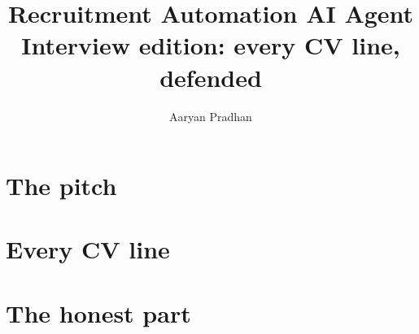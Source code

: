 \documentclass[11pt,oneside]{book}
\title{Recruitment Automation AI Agent\\[0.3em]\large Interview edition: every CV line, defended}
\author{Aaryan Pradhan}
\date{}
\begin{document}
\frontmatter
\maketitle
\tableofcontents


\mainmatter
\part{The pitch}


\part{Every CV line}




\part{The honest part}


\backmatter
\printindex
\end{document}
